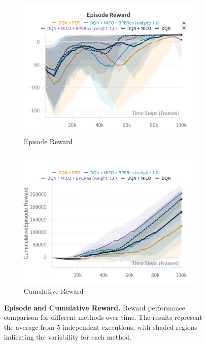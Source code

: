 \begin{figure}[h]
    \centering
    \begin{subfigure}{0.45\textwidth}
    \includegraphics[width=\linewidth]{Results/grid_world/episode_reward_grid_world_window_100.png}
        \caption{Episode Reward}
        \label{fig:episode_reward_grid_world}
    \end{subfigure}
    \hfill
    \begin{subfigure}{0.45\textwidth}
        \includegraphics[width=\linewidth]{Results/grid_world/cumulative_episode_return.png}
        \caption{Cumulative Reward}
        \label{fig:cumulative_reward}
    \end{subfigure}
    \caption[Episode and Cumulative Reward]{\textbf{Episode and Cumulative Reward.} Reward performance comparison for different methods over time. The results represent the average from 5 independent executions, with shaded regions indicating the variability for each method.}
    \label{fig:cumulative_episode_reward}

\end{figure}


